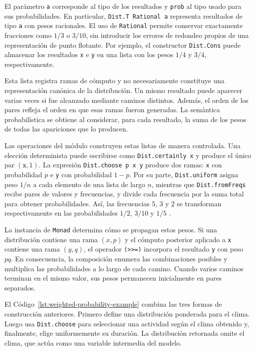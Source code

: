 El parámetro \texttt{a} corresponde al tipo de los resultados y \texttt{prob} al tipo usado para sus probabilidades. En particular, \texttt{Dist.T Rational a} representa resultados de tipo \texttt{a} con pesos racionales. El uso de \texttt{Rational} permite conservar exactamente fracciones como $1/3$ o $3/10$, sin introducir los errores de redondeo propios de una representación de punto flotante. Por ejemplo, el constructor \texttt{Dist.Cons} puede almacenar los resultados \texttt{x} e \texttt{y} en una lista con los pesos $1/4$ y $3/4$, respectivamente.

Esta lista registra ramas de cómputo y no necesariamente constituye una representación canónica de la distribución. Un mismo resultado puede aparecer varias veces si fue alcanzado mediante caminos distintos. Además, el orden de los pares refleja el orden en que esas ramas fueron generadas. La semántica probabilística se obtiene al considerar, para cada resultado, la suma de los pesos de todas las apariciones que lo producen.

Las operaciones del módulo construyen estas listas de manera controlada. Una elección determinista puede escribirse como \texttt{Dist.certainly x} y produce el único par $(\mathtt{x},1)$. La expresión \texttt{Dist.choose p x y} produce dos ramas: \texttt{x} con probabilidad $p$ e \texttt{y} con probabilidad $1-p$. Por su parte, \texttt{Dist.uniform} asigna peso $1/n$ a cada elemento de una lista de largo $n$, mientras que \texttt{Dist.fromFreqs} recibe pares de valores y frecuencias, y divide cada frecuencia por la suma total para obtener probabilidades. Así, las frecuencias $5$, $3$ y $2$ se transforman respectivamente en las probabilidades $1/2$, $3/10$ y $1/5$ \cite{HackageProbabilityDistribution}.

La instancia de \texttt{Monad} determina cómo se propagan estos pesos. Si una distribución contiene una rama $(x,p)$ y el cómputo posterior aplicado a \texttt{x} contiene una rama $(y,q)$, el operador \verb|(>>=)| incorpora el resultado \texttt{y} con peso $p q$. En consecuencia, la composición enumera las combinaciones posibles y multiplica las probabilidades a lo largo de cada camino. Cuando varios caminos terminan en el mismo valor, sus pesos permanecen inicialmente en pares separados.

El Código~\ref{lst:weighted-probability-example} combina las tres formas de construcción anteriores. Primero define una distribución ponderada para el clima. Luego usa \texttt{Dist.choose} para seleccionar una actividad según el clima obtenido y, finalmente, elige uniformemente su duración. La distribución retornada omite el clima, que actúa como una variable intermedia del modelo.

